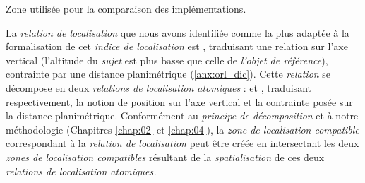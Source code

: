 \begin{carte}
  \centering 
  \caption{Zone utilisée pour la comparaison des implémentations.}
  \label{fig:ZIR_HT}
\end{carte}

La \emph{relation de localisation} que nous avons identifiée comme la
plus adaptée à la formalisation de cet \emph{indice de localisation}
est , traduisant une relation sur l'axe
vertical (l'altitude du \emph{sujet} est plus basse que celle de
\emph{l'objet de référence}), contrainte par une distance
planimétrique (\autoref{anx:orl_dic}). Cette \emph{relation} se
décompose en deux \emph{relations de localisation atomiques} :
 et
,
traduisant respectivement, la notion de position sur l'axe vertical et
la contrainte posée sur la distance planimétrique. Conformément au
\emph{principe de décomposition} et à notre méthodologie (Chapitres
\ref{chap:02} et \ref{chap:04}), la \emph{zone de localisation
  compatible} correspondant à la \emph{relation de localisation}
 peut être créée en intersectant les
deux \emph{zones de localisation compatibles} résultant de la
\emph{spatialisation} de ces deux \emph{relations de localisation
  atomiques.}

